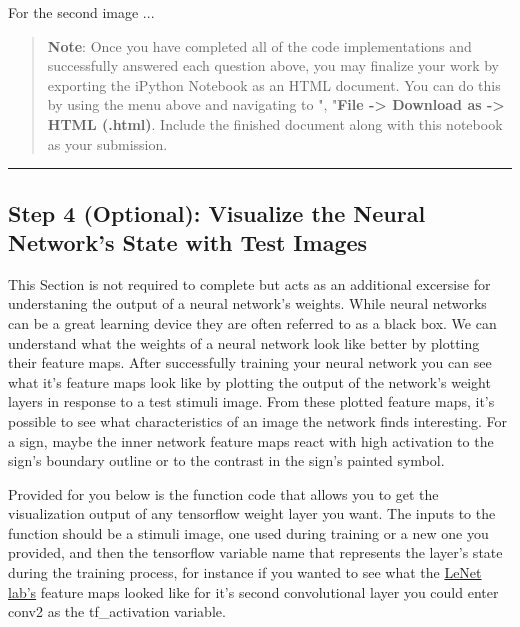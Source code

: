 \documentclass[11pt]{article}
\begin{document}
For the second image ...

    \begin{quote}
\textbf{Note}: Once you have completed all of the code implementations
and successfully answered each question above, you may finalize your
work by exporting the iPython Notebook as an HTML document. You can do
this by using the menu above and navigating to \n", "\textbf{File
-\textgreater{} Download as -\textgreater{} HTML (.html)}. Include the
finished document along with this notebook as your submission.
\end{quote}

    \begin{center}\rule{0.5\linewidth}{\linethickness}\end{center}

\subsection{Step 4 (Optional): Visualize the Neural Network's State with
Test
Images}\label{step-4-optional-visualize-the-neural-networks-state-with-test-images}

This Section is not required to complete but acts as an additional
excersise for understaning the output of a neural network's weights.
While neural networks can be a great learning device they are often
referred to as a black box. We can understand what the weights of a
neural network look like better by plotting their feature maps. After
successfully training your neural network you can see what it's feature
maps look like by plotting the output of the network's weight layers in
response to a test stimuli image. From these plotted feature maps, it's
possible to see what characteristics of an image the network finds
interesting. For a sign, maybe the inner network feature maps react with
high activation to the sign's boundary outline or to the contrast in the
sign's painted symbol.

Provided for you below is the function code that allows you to get the
visualization output of any tensorflow weight layer you want. The inputs
to the function should be a stimuli image, one used during training or a
new one you provided, and then the tensorflow variable name that
represents the layer's state during the training process, for instance
if you wanted to see what the
\href{https://classroom.udacity.com/nanodegrees/nd013/parts/fbf77062-5703-404e-b60c-95b78b2f3f9e/modules/6df7ae49-c61c-4bb2-a23e-6527e69209ec/lessons/601ae704-1035-4287-8b11-e2c2716217ad/concepts/d4aca031-508f-4e0b-b493-e7b706120f81}{LeNet
lab's} feature maps looked like for it's second convolutional layer you
could enter conv2 as the tf\_activation variable.
\end{document}
